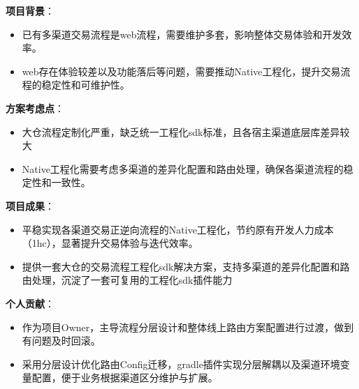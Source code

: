 \documentclass[]{deedy-resume-openfont}
\begin{document}
\begin{minipage}[t]{0.75\textwidth}
\vspace{0.1em}
\vspace{0.1em}
\begin{tightemize}
    \item \textbf{项目背景}：
        \begin{itemize}
            \item 已有多渠道交易流程是web流程，需要维护多套，影响整体交易体验和开发效率。
            \item web存在体验较差以及功能落后等问题，需要推动Native工程化，提升交易流程的稳定性和可维护性。
        \end{itemize}
    \item \textbf{方案考虑点}：
        \begin{itemize}
            \item 大仓流程定制化严重，缺乏统一工程化sdk标准，且各宿主渠道底层库差异较大
            \item Native工程化需要考虑多渠道的差异化配置和路由处理，确保各渠道流程的稳定性和一致性。
        \end{itemize}
    \item \textbf{项目成果}：
        \begin{itemize}
            \item 平稳实现各渠道交易正逆向流程的Native工程化，节约原有开发人力成本（1hc），显著提升交易体验与迭代效率。
            \item 提供一套大仓的交易流程工程化sdk解决方案，支持多渠道的差异化配置和路由处理，沉淀了一套可复用的工程化sdk插件能力
        \end{itemize}
    \item \textbf{个人贡献}：
        \begin{itemize}
            \item 作为项目Owner，主导流程分层设计和整体线上路由方案配置进行过渡，做到有问题及时回滚。
            \item 采用分层设计优化路由Config迁移，gradle插件实现分层解耦以及渠道环境变量配置，便于业务根据渠道区分维护与扩展。
        \end{itemize}
\end{tightemize}
\sectionsep


\end{minipage}
\end{document}
